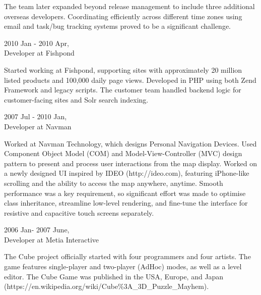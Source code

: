 \begin{resume}
\begin{minipage}{\textwidth}
The team later expanded beyond release management to include three additional overseas developers. Coordinating efficiently across different time zones using email and task/bug tracking systems proved to be a significant challenge.
\vspace{0.03in}
\end{minipage}

\hspace*{-0.25in} 2010 Jan - 2010 Apr,\\
\hspace*{-0.25in} Developer at Fishpond

Started working at Fishpond, supporting sites with approximately 20 million listed products and 100,000 daily page views. Developed in PHP using both Zend Framework and legacy scripts. The customer team handled backend logic for customer-facing sites and Solr search indexing.

\begin{minipage}{\textwidth}
\vspace{0.03in}
\hspace*{-0.25in} 2007 Jul - 2010 Jan,\\
\hspace*{-0.25in} Developer at Navman
\vspace{0.165in}

Worked at Navman Technology, which designs Personal Navigation Devices. Used Component Object Model (COM) and Model-View-Controller (MVC) design pattern to present and process user interactions from the map display. Worked on a newly designed UI inspired by IDEO (http://ideo.com), featuring iPhone-like scrolling and the ability to access the map anywhere, anytime. Smooth performance was a key requirement, so significant effort was made to optimise class inheritance, streamline low-level rendering, and fine-tune the interface for resistive and capacitive touch screens separately.
\vspace{0.03in}
\end{minipage}

\hspace*{-0.25in} 2006 Jan- 2007 June,\\
\hspace*{-0.25in} Developer at Metia Interactive

The Cube project officially started with four programmers and four artists. The game features single-player and two-player (AdHoc) modes, as well as a level editor. The Cube Game was published in the USA, Europe, and Japan (https://en.wikipedia.org/wiki/Cube\%3A\_3D\_Puzzle\_Mayhem).


\end{resume}
